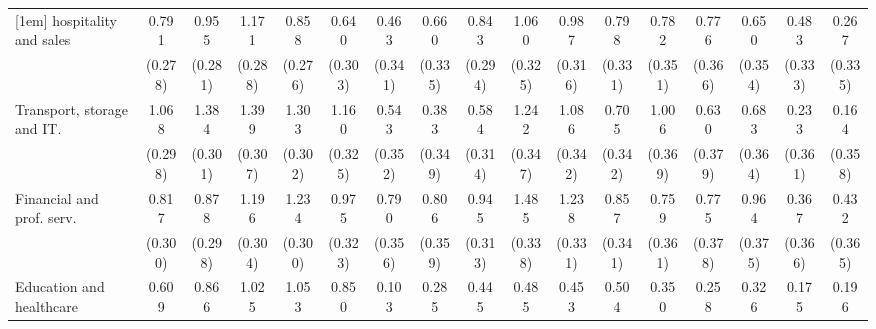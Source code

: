 {\begin{tabular}{l*{16}{c}}
[1em]
hospitality and sales&       0.791\sym{**} &       0.955\sym{***}&       1.171\sym{***}&       0.858\sym{**} &       0.640\sym{*}  &       0.463         &       0.660\sym{*}  &       0.843\sym{**} &       1.060\sym{**} &       0.987\sym{**} &       0.798\sym{*}  &       0.782\sym{*}  &       0.776\sym{*}  &       0.650         &       0.483         &       0.267         \\
                    &     (0.278)         &     (0.281)         &     (0.288)         &     (0.276)         &     (0.303)         &     (0.341)         &     (0.335)         &     (0.294)         &     (0.325)         &     (0.316)         &     (0.331)         &     (0.351)         &     (0.366)         &     (0.354)         &     (0.333)         &     (0.335)         \\
[1em]
Transport, storage and IT.&       1.068\sym{***}&       1.384\sym{***}&       1.399\sym{***}&       1.303\sym{***}&       1.160\sym{***}&       0.543         &       0.383         &       0.584         &       1.242\sym{***}&       1.086\sym{**} &       0.705\sym{*}  &       1.006\sym{**} &       0.630         &       0.683         &       0.233         &       0.164         \\
                    &     (0.298)         &     (0.301)         &     (0.307)         &     (0.302)         &     (0.325)         &     (0.352)         &     (0.349)         &     (0.314)         &     (0.347)         &     (0.342)         &     (0.342)         &     (0.369)         &     (0.379)         &     (0.364)         &     (0.361)         &     (0.358)         \\
[1em]
Financial and prof. serv.&       0.817\sym{**} &       0.878\sym{**} &       1.196\sym{***}&       1.234\sym{***}&       0.975\sym{**} &       0.790\sym{*}  &       0.806\sym{*}  &       0.945\sym{**} &       1.485\sym{***}&       1.238\sym{***}&       0.857\sym{*}  &       0.759\sym{*}  &       0.775\sym{*}  &       0.964\sym{*}  &       0.367         &       0.432         \\
                    &     (0.300)         &     (0.298)         &     (0.304)         &     (0.300)         &     (0.323)         &     (0.356)         &     (0.359)         &     (0.313)         &     (0.338)         &     (0.331)         &     (0.341)         &     (0.361)         &     (0.378)         &     (0.375)         &     (0.366)         &     (0.365)         \\
[1em]
Education and healthcare&       0.609         &       0.866\sym{**} &       1.025\sym{**} &       1.053\sym{**} &       0.850\sym{*}  &       0.103         &       0.285         &       0.445         &       0.485         &       0.453         &       0.504         &       0.350         &       0.258         &       0.326         &       0.175         &       0.196         \\

\end{tabular}}
